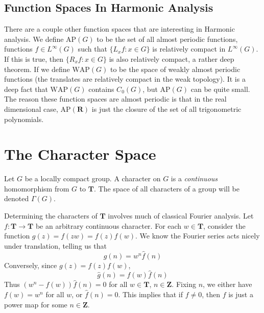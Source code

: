 \section{Function Spaces In Harmonic Analysis}

There are a couple other function spaces that are interesting in Harmonic analysis. We define $\text{AP}(G)$ to be the set of all almost periodic functions, functions $f \in L^\infty(G)$ such that $\{ L_x f : x \in G \}$ is relatively compact in $L^\infty(G)$. If this is true, then $\{ R_x f : x \in G \}$ is also relatively compact, a rather deep theorem. If we define $\text{WAP}(G)$ to be the space of weakly almost periodic functions (the translates are relatively compact in the weak topology). It is a deep fact that $\text{WAP}(G)$ contains $C_0(G)$, but $\text{AP}(G)$ can be quite small. The reason these function spaces are almost periodic is that in the real dimensional case, $\text{AP}(\mathbf{R})$ is just the closure of the set of all trigonometric polynomials.

\chapter{The Character Space}

Let $G$ be a locally compact group. A character on $G$ is a {\it continuous} homomorphism from $G$ to $\mathbf{T}$. The space of all characters of a group will be denoted $\Gamma(G)$.

\begin{example}
    Determining the characters of $\mathbf{T}$ involves much of classical Fourier analysis. Let $f: \mathbf{T} \to \mathbf{T}$ be an arbitrary continuous character. For each $w \in \mathbf{T}$, consider the function $g(z) = f(zw) = f(z)f(w)$. We know the Fourier series acts nicely under translation, telling us that
    \[ \hat{g}(n) = w^n \hat{f}(n) \]
    Conversely, since $g(z) = f(z)f(w)$,
    \[ \hat{g}(n) = f(w) \hat{f}(n) \]
    Thus $(w^n - f(w)) \hat{f}(n) = 0$ for all $w \in \mathbf{T}$, $n \in \mathbf{Z}$. Fixing $n$, we either have $f(w) = w^n$ for all $w$, or $\hat{f}(n) = 0$. This implies that if $f \neq 0$, then $f$ is just a power map for some $n \in \mathbf{Z}$.
\end{example}

